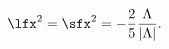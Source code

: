 \begin{equation}
\label{eq:warpF}
\lfx^2 = \sfx^2 = -\frac{2}{5} \frac{\Lambda}{|\Lambda|}.
\end{equation}

